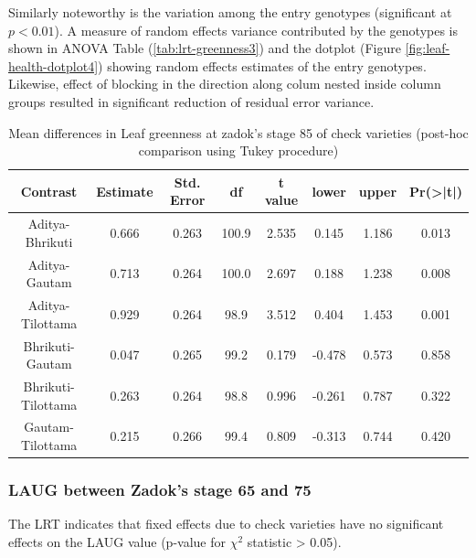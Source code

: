 \documentclass[12pt,oneside]{dukestatscithesis} %
\begin{document}
Similarly noteworthy is the variation among the entry genotypes (significant at \(p < 0.01\)). A measure of random effects variance contributed by the genotypes is shown in ANOVA Table (\ref{tab:lrt-greenness3}) and the dotplot (Figure \ref{fig:leaf-health-dotplot4}) showing random effects estimates of the entry genotypes. Likewise, effect of blocking in the direction along colum nested inside column groups resulted in significant reduction of residual error variance.
\begin{table}[H]

\caption{\label{tab:leaf-health-meanconf-tab4}Mean differences in Leaf greenness at zadok's stage 85 of check varieties (post-hoc comparison using Tukey procedure)}
\centering
\begin{tabular}[t]{cccccccc}
\toprule
Contrast & Estimate & Std. Error & df & t value & lower & upper & Pr(>|t|)\\
\midrule
Aditya-Bhrikuti & 0.666 & 0.263 & 100.9 & 2.535 & 0.145 & 1.186 & 0.013\\
Aditya-Gautam & 0.713 & 0.264 & 100.0 & 2.697 & 0.188 & 1.238 & 0.008\\
Aditya-Tilottama & 0.929 & 0.264 & 98.9 & 3.512 & 0.404 & 1.453 & 0.001\\
Bhrikuti-Gautam & 0.047 & 0.265 & 99.2 & 0.179 & -0.478 & 0.573 & 0.858\\
Bhrikuti-Tilottama & 0.263 & 0.264 & 98.8 & 0.996 & -0.261 & 0.787 & 0.322\\
Gautam-Tilottama & 0.215 & 0.266 & 99.4 & 0.809 & -0.313 & 0.744 & 0.420\\
\bottomrule
\end{tabular}
\end{table}
\hypertarget{laug-between-zadoks-stage-65-and-75}{%
\subsubsection{LAUG between Zadok's stage 65 and 75}\label{laug-between-zadoks-stage-65-and-75}}

The LRT indicates that fixed effects due to check varieties have no significant effects on the LAUG value (p-value for \(\chi^2\) statistic \textgreater{} 0.05).
\end{document}
